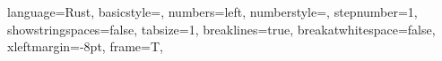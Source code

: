 \newcommand{\figref}[1]{Figure \ref{#1}}
\newcommand{\lstref}[1]{Listing \ref{#1}}
\newcommand{\tabref}[1]{Table \ref{#1}}

\usepackage{listings, listings-rust}
\usepackage[framemethod=TikZ]{mdframed}
\lstset
{
	language=Rust,
	basicstyle=\footnotesize,
	numbers=left,
	numberstyle=\tiny,
	stepnumber=1,
	showstringspaces=false,
	tabsize=1,
	breaklines=true,
	breakatwhitespace=false,
	xleftmargin=-8pt,
	frame=T,
}
\newcommand{\codefileNoFigure}[3]{
	\mdframed[roundcorner=5pt, backgroundcolor=blue!30]
	
	\endmdframed
}
\newcommand{\codefileRustNoFigure}[3]{
	\mdframed[roundcorner=5pt, backgroundcolor=blue!30]
	
	\endmdframed
}
\newcommand{\codefile}[3]{
	\begin{figure}[H]
		\codefileNoFigure{#1}{#2}{#3}
	\end{figure}
}
